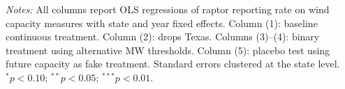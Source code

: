 \begin{table}[htbp]
\begin{tablenotes}[flushleft]\footnotesize
\item \textit{Notes:} All columns report OLS regressions of raptor reporting rate on wind capacity measures with state and year fixed effects. Column (1): baseline continuous treatment. Column (2): drops Texas. Columns (3)--(4): binary treatment using alternative MW thresholds. Column (5): placebo test using future capacity as fake treatment. Standard errors clustered at the state level. $^{*}p<0.10$; $^{**}p<0.05$; $^{***}p<0.01$.
\end{tablenotes}
\end{table}
